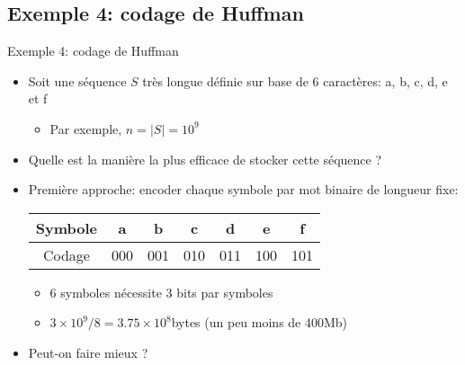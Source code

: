 \subsection{Exemple 4: codage de Huffman}

\begin{frame}{Exemple 4: codage de Huffman}
\begin{itemize}
\item Soit une séquence $S$ très longue définie sur base de 6 caractères: a, b, c, d, e et f
\begin{itemize}
\item Par exemple, $n=|S|=10^9$
\end{itemize}

\bigskip

\item Quelle est la manière la plus efficace de stocker cette séquence ?

\bigskip

\item Première approche: encoder chaque symbole par mot binaire de
  longueur fixe:

\begin{center}
\begin{tabular}{c|cccccc}
Symbole & a & b & c & d & e & f\\
\hline
Codage & 000 & 001 & 010 & 011 & 100 & 101\\
\end{tabular}
\end{center}

\begin{itemize}
\item 6 symboles nécessite 3 bits par symboles
\item $3\times 10^9/8=3.75\times 10^8$bytes (un peu moins de 400Mb)
\end{itemize}
\item Peut-on faire mieux ?
\end{itemize}

\end{frame}

